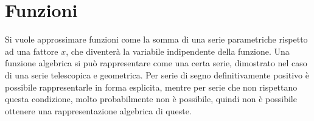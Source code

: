 \documentclass{article}
\numberwithin{equation}{subsection}
\begin{document}
\section{Funzioni}

Si vuole approssimare funzioni come la somma di una serie parametriche rispetto ad una fattore $x$, che diventerà la variabile indipendente della funzione. Una funzione algebrica si può rappresentare come una certa serie, dimostrato nel caso di una serie telescopica e geometrica. Per serie di segno definitivamente positivo è possibile rappresentarle in forma esplicita, mentre per serie che non rispettano questa condizione, molto probabilmente non è possibile, quindi non è possibile ottenere una rappresentazione algebrica di queste. 
\end{document}
